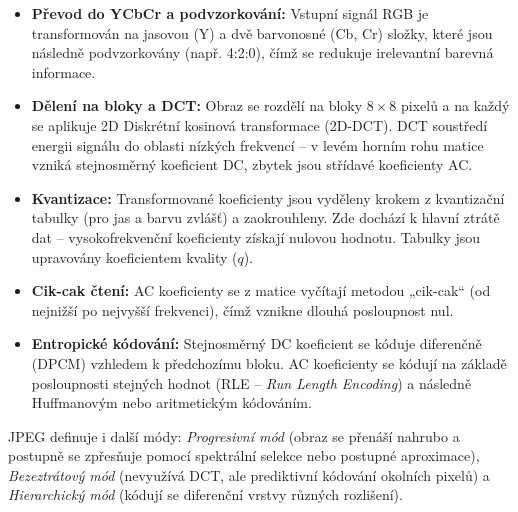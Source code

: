         \begin{itemize}
            \item \textbf{Převod do YCbCr a podvzorkování:} Vstupní signál RGB je transformován na jasovou (Y) a dvě barvonosné (Cb, Cr) složky, které jsou následně podvzorkovány (např. 4:2:0), čímž se redukuje irelevantní barevná informace.
            \item \textbf{Dělení na bloky a DCT:} Obraz se rozdělí na bloky $8 \times 8$ pixelů a na každý se aplikuje 2D Diskrétní kosinová transformace (2D-DCT). DCT soustředí energii signálu do oblasti nízkých frekvencí -- v levém horním rohu matice vzniká stejnosměrný koeficient DC, zbytek jsou střídavé koeficienty AC.
            \item \textbf{Kvantizace:} Transformované koeficienty jsou vyděleny krokem z kvantizační tabulky (pro jas a barvu zvlášť) a zaokrouhleny. Zde dochází k hlavní ztrátě dat -- vysokofrekvenční koeficienty získají nulovou hodnotu. Tabulky jsou upravovány koeficientem kvality ($q$).
            \item \textbf{Cik-cak čtení:} AC koeficienty se z matice vyčítají metodou „cik-cak“ (od nejnižší po nejvyšší frekvenci), čímž vznikne dlouhá posloupnost nul.
            \item \textbf{Entropické kódování:} Stejnosměrný DC koeficient se kóduje diferenčně (DPCM) vzhledem k předchozímu bloku. AC koeficienty se kódují na základě posloupnosti stejných hodnot (RLE -- \textit{Run Length Encoding}) a následně Huffmanovým nebo aritmetickým kódováním.
        \end{itemize}
        
        JPEG definuje i další módy: \textit{Progresivní mód} (obraz se přenáší nahrubo a postupně se zpřesňuje pomocí spektrální selekce nebo postupné aproximace), \textit{Bezeztrátový mód} (nevyužívá DCT, ale prediktivní kódování okolních pixelů) a \textit{Hierarchický mód} (kódují se diferenční vrstvy různých rozlišení).
